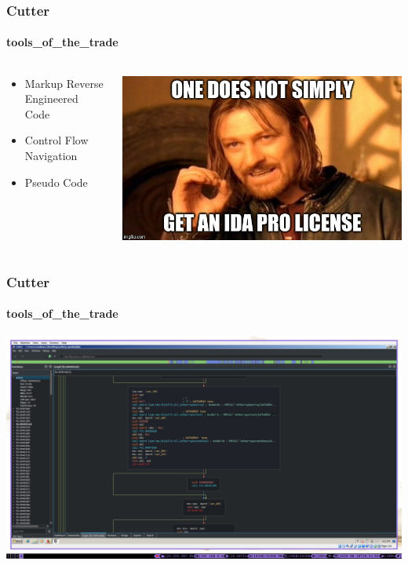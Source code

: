 \documentclass[aspectratio=169]{beamer}
\begin{document}
\begin{frame}
  \frametitle{Cutter}
  \framesubtitle{tools\_of\_the\_trade}
  \begin{columns}
    \begin{column}{.3\textwidth}
      \begin{itemize}
      \item{Markup Reverse Engineered Code}
      \item{Control Flow Navigation}
      \item{Pseudo Code}
      \end{itemize}
    \end{column}
    \hfill
    \begin{column}{.7\textwidth}
      \begin{center}
        \includegraphics[scale=0.4]{ida-pro-meme}
      \end{center}
    \end{column}
  \end{columns}
\end{frame}

\begin{frame}
  \frametitle{Cutter}
  \framesubtitle{tools\_of\_the\_trade}
  \begin{center}
    \includegraphics[scale=0.18]{cutter-graph}
  \end{center}
\end{frame}
\end{document}

